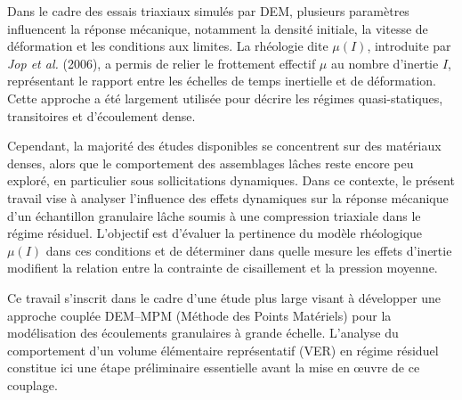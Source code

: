 Dans le cadre des essais triaxiaux simulés par DEM, plusieurs paramètres influencent la réponse mécanique, notamment la densité initiale, la vitesse de déformation et les conditions aux limites. 
La rhéologie dite $\mu(I)$, introduite par \textit{Jop et al.} (2006), a permis de relier le frottement effectif $\mu$ au nombre d’inertie $I$, représentant le rapport entre les échelles de temps inertielle et de déformation. 
Cette approche a été largement utilisée pour décrire les régimes quasi-statiques, transitoires et d’écoulement dense.

Cependant, la majorité des études disponibles se concentrent sur des matériaux denses, alors que le comportement des assemblages lâches reste encore peu exploré, en particulier sous sollicitations dynamiques. 
Dans ce contexte, le présent travail vise à analyser l’influence des effets dynamiques sur la réponse mécanique d’un échantillon granulaire lâche soumis à une compression triaxiale dans le régime résiduel. 
L’objectif est d’évaluer la pertinence du modèle rhéologique $\mu(I)$ dans ces conditions et de déterminer dans quelle mesure les effets d’inertie modifient la relation entre la contrainte de cisaillement et la pression moyenne.

Ce travail s’inscrit dans le cadre d’une étude plus large visant à développer une approche couplée DEM–MPM (Méthode des Points Matériels) pour la modélisation des écoulements granulaires à grande échelle. 
L’analyse du comportement d’un volume élémentaire représentatif (VER) en régime résiduel constitue ici une étape préliminaire essentielle avant la mise en œuvre de ce couplage.
